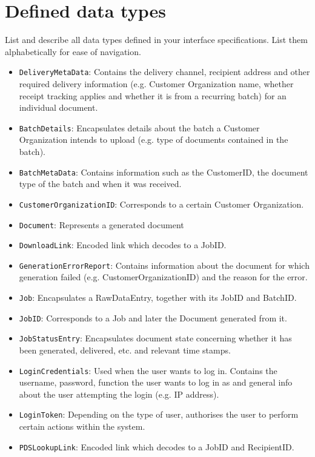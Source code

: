 \section{Defined data types}\label{app:datatypes}
List and describe all data types defined in your interface specifications. List
them alphabetically for ease of navigation.

\begin{itemize}
	\item \texttt{DeliveryMetaData}: Contains the delivery channel, recipient address and other required delivery information (e.g. Customer Organization name, whether receipt tracking applies and whether it is from a recurring batch) for an individual document.
	\item \texttt{BatchDetails}: Encapsulates details about the batch a Customer Organization intends to upload (e.g. type of documents contained in the batch).
	\item \texttt{BatchMetaData}: Contains information such as the CustomerID, the document type of the batch and when it was received.
	\item \texttt{CustomerOrganizationID}: Corresponds to a certain Customer Organization.
	\item \texttt{Document}: Represents a generated document
	\item \texttt{DownloadLink}: Encoded link which decodes to a JobID.
	\item \texttt{GenerationErrorReport}: Contains information about the document for which generation failed (e.g. CustomerOrganizationID) and the reason for the error.
	\item \texttt{Job}: Encapsulates a RawDataEntry, together with its JobID and BatchID.
	\item \texttt{JobID}: Corresponds to a Job and later the Document generated from it.
	\item \texttt{JobStatusEntry}: Encapsulates document state concerning whether it has been generated, delivered, etc. and relevant time stamps.
    \item \texttt{LoginCredentials}: Used when the user wants to log in. Contains the username, password, function the user wants to log in as and general info about the user attempting the login (e.g. IP address).
    \item \texttt{LoginToken}: Depending on the type of user, authorises the user to perform certain actions within the system.
    \item \texttt{PDSLookupLink}: Encoded link which decodes to a JobID and RecipientID.

\end{itemize}
